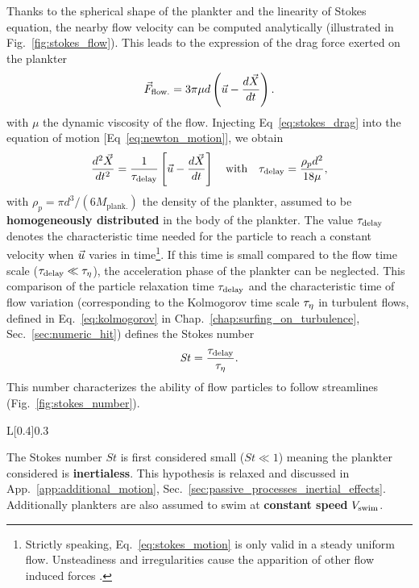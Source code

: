 Thanks to the spherical shape of the plankter and the linearity of Stokes equation, the nearby flow velocity can be computed analytically (illustrated in Fig.~\ref{fig:stokes_flow}).
This leads to the expression of the drag force exerted on the plankter \citep{stokes1851effect}
\begin{equation}\label{eq:stokes_drag}
	\vec{F}_{\mathrm{flow.}} = 3 \pi \mu d \left( \vec{u} - \frac{d\vec{X}}{dt} \right).
\end{equation}
with $\mu$ the dynamic viscosity of the flow.
Injecting Eq~\eqref{eq:stokes_drag} into the equation of motion [Eq~\eqref{eq:newton_motion}], we obtain
\begin{equation}\label{eq:stokes_motion}
	\frac{d^2 \vec{X}}{d t^2} = \frac{1}{\tau_{\mathrm{delay}}} \left[ \vec{u} - \frac{d\vec{X}}{dt} \right] \quad \text{with} \quad \tau_{\mathrm{delay}} = \frac{\rho_p d^2}{18 \mu},
\end{equation}
with $\rho_p = \pi d^3/(6 M_{\mathrm{plank.}})$ the density of the plankter, assumed to be \textbf{homogeneously distributed} in the body of the plankter.
The value $\tau_{\mathrm{delay}}$ denotes the characteristic time needed for the particle to reach a constant velocity when $\vec{u}$ varies in time\footnote{Strictly speaking, Eq.~\eqref{eq:stokes_motion} is only valid in a steady uniform flow. Unsteadiness and irregularities cause the apparition of other flow induced forces \citep{maxey1987motion, wang2012unsteady, more2020motion}.}.
If this time is small compared to the flow time scale ($\tau_{\mathrm{delay}} \ll \tau_{\eta}$), the acceleration phase of the plankter can be neglected.
This comparison of the particle relaxation time $\tau_{\mathrm{delay}}$ and the characteristic time of flow variation (corresponding to the Kolmogorov time scale $\tau_{\eta}$ in turbulent flows, defined in Eq.~\ref{eq:kolmogorov} in Chap.~\ref{chap:surfing_on_turbulence}, Sec.~\ref{sec:numeric_hit}) defines the Stokes number
\begin{equation}\label{eq:stokes_number}
	\mathit{St} = \frac{\tau_{\mathrm{delay}}}{\tau_{\eta}}.
\end{equation}
This number characterizes the ability of flow particles to follow streamlines (Fig.~\ref{fig:stokes_number}).
\begin{wrapfigure}[15]{L}[0.4\width]{0.3\textwidth}
	\centering
	\vspace{5pt}
	\def\svgwidth{0.25\textwidth}
	
	\captionsetup{width=0.25\textwidth}
  	\caption{
  		Illustration of the influence of the Stokes number.
  	}
  	\label{fig:stokes_number}
\end{wrapfigure}
The Stokes number $\mathit{St}$ is first considered small ($\mathit{St} \ll 1$) meaning the plankter considered is \textbf{inertialess}.
This hypothesis is relaxed and discussed in App.~\ref{app:additional_motion}, Sec.~\ref{sec:passive_processes_inertial_effects}.
Additionally plankters are also assumed to swim at \textbf{constant speed} $V_{\mathrm{swim}}$.

